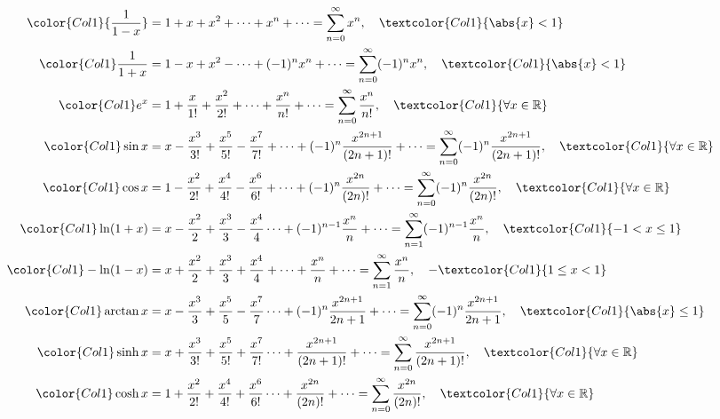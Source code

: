 \documentclass[a4paper,table]{report}
\begin{document}
\begin{center}
  \minibox{\large \bfseries \textcolor{Col1}{Αναπτύγματα Maclaurin 
  Βασικών Συναρτήσεων}}
\end{center}

\vspace{\baselineskip}

\setlength{\jot}{10pt}
\begin{align*}
  \color{Col1}{\frac{1}{1-x}}&= 1+x+x^2+\cdots +x^n+\cdots = \sum_{n=0}^{\infty}x^n, 
  \quad \textcolor{Col1}{\abs{x}<1} \\
  \color{Col1}\frac{1}{1+x}&=1-x+x^2-\cdots+(-1)^nx^n+\cdots = \sum_{n=0}^{\infty}(-1)^n 
  x^n, \quad \textcolor{Col1}{\abs{x}<1} \\
  \color{Col1}e^x&= 1+\frac{x}{1!}+\frac{x^2}{2!}+\cdots+\frac{x^n}{n!}+\cdots =
  \sum_{n=0}^{\infty}\frac{x^n}{n!}, \quad \textcolor{Col1}{\forall x \in \mathbb{R}} \\
  \color{Col1}\sin x&=x-\frac{x^3}{3!}+\frac{x^5}{5!}-\frac{x^7}{7!}+\cdots+(-1)^n\frac{
  x^{2n+1}}{(2n+1)!}+\cdots = \sum_{n=0}^{\infty}(-1)^n\frac{x^{2n+1}}{(2n+1)!},\quad
  \textcolor{Col1}{\forall x \in \mathbb{R}} \\
  \color{Col1}\cos x&=1-\frac{x^2}{2!}+\frac{x^4}{4!}-\frac{x^6}{6!}+\cdots+(-1)^n
  \frac{x^{2n}}{(2n)!}+\cdots = \sum_{n=0}^{\infty}(-1)^n\frac{x^{2n}}{(2n)!}, \quad
  \textcolor{Col1}{\forall x \in \mathbb{R}} \\
  \color{Col1}\ln(1+x)&=x-\frac{x^2}{2}+\frac{x^3}{3}-\frac{x^4}{4}\cdots+(-1)^{n-1}
  \frac{x^n}{n}+\cdots=\sum_{n=1}^{\infty}(-1)^{n-1}\frac{x^n}{n}, \quad
  \textcolor{Col1}{-1<x\leq 1} \\
  \color{Col1}-\ln(1-x)&=x+\frac{x^2}{2}+\frac{x^3}{3}+\frac{x^4}{4}+\cdots+
  \frac{x^n}{n}+\cdots = \sum_{n=1}^{\infty}\frac{x^n}{n}, \quad -\textcolor{Col1}{1\leq
  x<1} \\
  \color{Col1}\arctan x&=x-\frac{x^3}{3}+\frac{x^5}{5}-\frac{x^7}{7}\cdots+(-1)^n
  \frac{x^{2n+1}}{2n+1}+\cdots = \sum_{n=0}^{\infty}(-1)^n\frac{x^{2n+1}}{2n+1},
  \quad \textcolor{Col1}{\abs{x}\leq 1} \\
  \color{Col1}\sinh x&= x +\frac{x^3}{3!}+\frac{x^5}{5!}+\frac{x^7}{7!}\cdots+
  \frac{x^{2n+1}}{(2n+1)!}+\cdots = \sum_{n=0}^{\infty}\frac{x^{2n+1}}{(2n+1)!},
  \quad \textcolor{Col1}{\forall x \in \mathbb{R}} \\
  \color{Col1}\cosh x&= 1+\frac{x^2}{2!}+\frac{x^4}{4!}+\frac{x^6}{6!}\cdots
  +\frac{x^{2n}}{(2n)!}+\cdots = \sum_{n=0}^{\infty}\frac{x^{2n}}{(2n)!}, \quad 
  \textcolor{Col1}{\forall x \in \mathbb{R}}
\end{align*}
\end{document}
